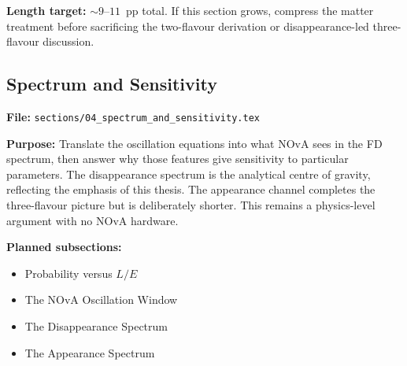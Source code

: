 \documentclass[11pt]{article}
\begin{document}
\textbf{Length target:} $\sim 9$--$11$~pp total. If this section grows, compress the matter
treatment before sacrificing the two-flavour derivation or disappearance-led three-flavour
discussion.

\subsection{Spectrum and Sensitivity}
\label{plan:spectrum}

\textbf{File:} \texttt{sections/04\_spectrum\_and\_sensitivity.tex}

\textbf{Purpose:} Translate the oscillation equations into what NOvA sees in the FD spectrum,
then answer why those features give sensitivity to particular parameters. The disappearance
spectrum is the analytical centre of gravity, reflecting the emphasis of this thesis. The
appearance channel completes the three-flavour picture but is deliberately shorter. This remains
a physics-level argument with no NOvA hardware.

\textbf{Planned subsections:}
\begin{itemize}
    \item Probability versus $L/E$
    \item The NOvA Oscillation Window
    \item The Disappearance Spectrum
    \item The Appearance Spectrum
\end{itemize}
\end{document}

